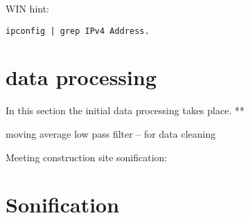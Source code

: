 \documentclass[11pt]{article}
\begin{document}
\vspace{0.2cm}
\noindent
WIN hint:
\begin{verbatim}
ipconfig | grep IPv4 Address.
\end{verbatim}


\section{data processing}
\label{sec:org5701d4c}
In this section the initial data processing takes place.
**


moving average low pass filter  -- for data cleaning

Meeting construction site sonification:
\section{Sonification}
\label{sec:org507888a}
\end{document}

